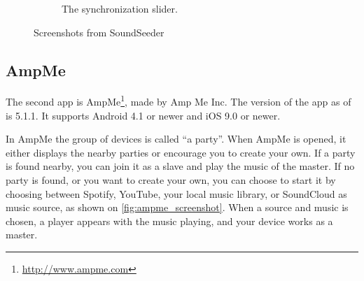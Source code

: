 \begin{figure}[h!]
\begin{subfigure}[b]{0.45\textwidth}
        \caption{The synchronization slider.}\label{fig:soundseeder_slider}
    \end{subfigure}
    \caption{Screenshots from SoundSeeder}\label{fig:soundseeder_screenshots}
\end{figure}

\subsection{AmpMe}\label{subsec:ampme}
The second app is AmpMe\footnote{\url{http://www.ampme.com}}, made by Amp Me Inc.
The version of the app as of  is 5.1.1.
It supports Android 4.1 or newer and iOS 9.0 or newer.

In AmpMe the group of devices is called ``a party''.
When AmpMe is opened, it either displays the nearby parties or encourage you to create your own.
If a party is found nearby, you can join it as a slave and play the music of the master.
If no party is found, or you want to create your own, you can choose to start it by choosing between Spotify,
YouTube, your local music library, or SoundCloud as music source, as shown on \cref{fig:ampme_screenshot}.
When a source and music is chosen, a player appears with the music playing, and your device works as a master.


